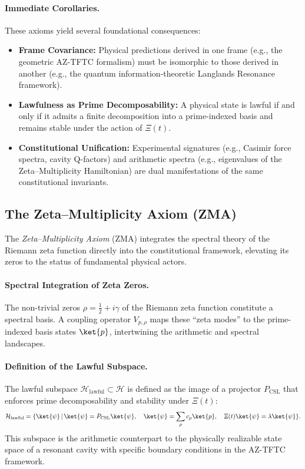 \documentclass[12]{amsart}
\theoremstyle{plain}
\begin{document}
\paragraph{Immediate Corollaries.}
These axioms yield several foundational consequences:
\begin{itemize}
    \item \textbf{Frame Covariance:} Physical predictions derived in one frame (e.g., the geometric AZ-TFTC formalism) must be isomorphic to those derived in another (e.g., the quantum information-theoretic Langlands Resonance framework).
    \item \textbf{Lawfulness as Prime Decomposability:} A physical state is lawful if and only if it admits a finite decomposition into a prime-indexed basis and remains stable under the action of $\Xi(t)$.
    \item \textbf{Constitutional Unification:} Experimental signatures (e.g., Casimir force spectra, cavity Q-factors) and arithmetic spectra (e.g., eigenvalues of the Zeta--Multiplicity Hamiltonian) are dual manifestations of the same constitutional invariants.
\end{itemize}

\subsection{The Zeta--Multiplicity Axiom (ZMA)}

The \emph{Zeta--Multiplicity Axiom} (ZMA) integrates the spectral theory of the Riemann zeta function directly into the constitutional framework, elevating its zeros to the status of fundamental physical actors.

\paragraph{Spectral Integration of Zeta Zeros.}
The non-trivial zeros $\rho = \frac{1}{2} + i\gamma$ of the Riemann zeta function constitute a spectral basis. A coupling operator $V_{p,\rho}$ maps these ``zeta modes'' to the prime-indexed basis states $\ket{p}$, intertwining the arithmetic and spectral landscapes.

\paragraph{Definition of the Lawful Subspace.}
The lawful subspace $\mathcal{H}_{\text{lawful}} \subset \mathcal{H}$ is defined as the image of a projector $P_{\text{CSL}}$ that enforces prime decomposability and stability under $\Xi(t)$:
\[
\mathcal{H}_{\text{lawful}} = \{ \ket{\psi} \, | \, \ket{\psi} = P_{\text{CSL}} \ket{\psi},\quad \ket{\psi} = \sum_p c_p \ket{p},\quad \Xi(t)\ket{\psi} = \lambda \ket{\psi} \}.
\]
This subspace is the arithmetic counterpart to the physically realizable state space of a resonant cavity with specific boundary conditions in the AZ-TFTC framework.
\end{document}
